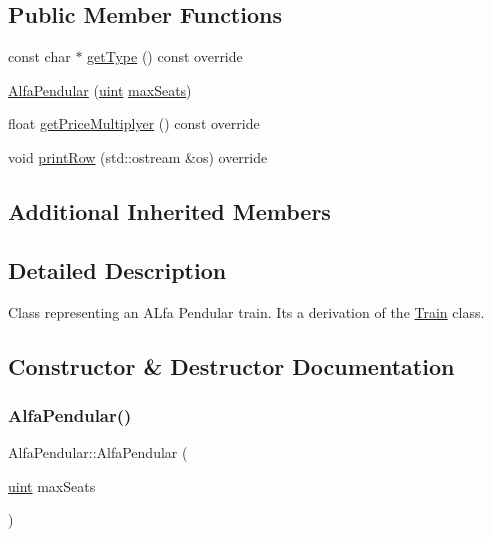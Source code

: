 \subsection*{Public Member Functions}
\begin{DoxyCompactItemize}
\item 
const char $\ast$ \mbox{\hyperlink{classAlfaPendular_a8bae5eb768c157fd2151dfb0d0134962}{get\+Type}} () const override
\item 
\mbox{\hyperlink{classAlfaPendular_ac194f781d3cb929f6ddcb5670dd7722d}{Alfa\+Pendular}} (\mbox{\hyperlink{project__utils_8h_a91ad9478d81a7aaf2593e8d9c3d06a14}{uint}} \mbox{\hyperlink{classTrain_a2954421b3beb871526ca169beca4c430}{max\+Seats}})
\item 
float \mbox{\hyperlink{classAlfaPendular_a12d09e5b65835ab7dcd3580ec8a41eee}{get\+Price\+Multiplyer}} () const override
\item 
void \mbox{\hyperlink{classAlfaPendular_aceb64b85c475612b8045d0108b448669}{print\+Row}} (std\+::ostream \&os) override
\end{DoxyCompactItemize}
\subsection*{Additional Inherited Members}


\subsection{Detailed Description}
Class representing an A\+Lfa Pendular train. Its a derivation of the \mbox{\hyperlink{classTrain}{Train}} class. 

\subsection{Constructor \& Destructor Documentation}
\mbox{\label{classAlfaPendular_ac194f781d3cb929f6ddcb5670dd7722d}} 
\subsubsection{\texorpdfstring{Alfa\+Pendular()}{AlfaPendular()}}
{\footnotesize\ttfamily Alfa\+Pendular\+::\+Alfa\+Pendular (\begin{DoxyParamCaption}\item[{\mbox{\hyperlink{project__utils_8h_a91ad9478d81a7aaf2593e8d9c3d06a14}{uint}}}]{max\+Seats }\end{DoxyParamCaption})}

